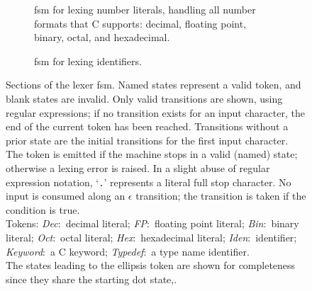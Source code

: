 \documentclass[00-main.tex]{subfiles}
\begin{document}
\begin{figure}[p]
  \hspace{2ex}
  \begin{subfigure}[t]{\textwidth-4ex}
    \centering
    \caption{\Gls{fsm} for lexing number literals, handling all number formats that C supports: decimal, floating point, binary, octal, and hexadecimal.}%
    \label{subfig:lexer fsm numbers}
  \end{subfigure}
  \par\vspace{2\bigskipamount}
  \begin{subfigure}[t]{\textwidth}
    \centering
    \caption{\Gls{fsm} for lexing identifiers.}%
    \label{subfig:lexer fsm identifiers}
  \end{subfigure}
  \caption{
    \protect{}Sections of the lexer \gls{fsm}.
    Named states represent a valid token, and blank states are invalid.
    Only valid transitions are shown, using regular expressions; if no transition exists for an input character, the end of the current token has been reached.
    Transitions without a prior state are the initial transitions for the first input character.
    The token is emitted if the machine stops in a valid (named) state; otherwise a lexing error is raised.
    In a slight abuse of regular expression notation, `\texttt{.}' represents a literal full stop character.
    No input is consumed along an $\epsilon$ transition; the transition is taken if the condition is true. \\
    Tokens: \emph{Dec}:~decimal literal; \emph{FP}:~floating point literal; \emph{Bin}:~binary literal; \emph{Oct}:~octal literal; \emph{Hex}:~hexadecimal literal; \emph{Iden}:~identifier; \emph{Keyword}:~a C keyword; \emph{Typedef}\!:~a type name identifier. \\
    The states leading to the ellipsis token are shown for completeness since they share the starting dot state,.
  }%
  \label{fig:lexer fsm}
\end{figure}
\end{document}
